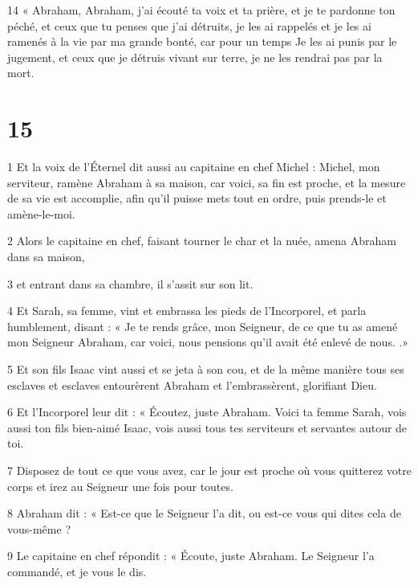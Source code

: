 \par 14 « Abraham, Abraham, j'ai écouté ta voix et ta prière, et je te pardonne ton péché, et ceux que tu penses que j'ai détruits, je les ai rappelés et je les ai ramenés à la vie par ma grande bonté, car pour un temps Je les ai punis par le jugement, et ceux que je détruis vivant sur terre, je ne les rendrai pas par la mort.

\chapter{15}

\par 1 Et la voix de l'Éternel dit aussi au capitaine en chef Michel : Michel, mon serviteur, ramène Abraham à sa maison, car voici, sa fin est proche, et la mesure de sa vie est accomplie, afin qu'il puisse mets tout en ordre, puis prends-le et amène-le-moi.

\par 2 Alors le capitaine en chef, faisant tourner le char et la nuée, amena Abraham dans sa maison,

\par 3 et entrant dans sa chambre, il s'assit sur son lit.

\par 4 Et Sarah, sa femme, vint et embrassa les pieds de l'Incorporel, et parla humblement, disant : « Je te rends grâce, mon Seigneur, de ce que tu as amené mon Seigneur Abraham, car voici, nous pensions qu'il avait été enlevé de nous. .»

\par 5 Et son fils Isaac vint aussi et se jeta à son cou, et de la même manière tous ses esclaves et esclaves entourèrent Abraham et l'embrassèrent, glorifiant Dieu.

\par 6 Et l'Incorporel leur dit : « Écoutez, juste Abraham. Voici ta femme Sarah, vois aussi ton fils bien-aimé Isaac, vois aussi tous tes serviteurs et servantes autour de toi.

\par 7 Disposez de tout ce que vous avez, car le jour est proche où vous quitterez votre corps et irez au Seigneur une fois pour toutes.

\par 8 Abraham dit : « Est-ce que le Seigneur l'a dit, ou est-ce vous qui dites cela de vous-même ?

\par 9 Le capitaine en chef répondit : « Écoute, juste Abraham. Le Seigneur l'a commandé, et je vous le dis.

